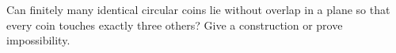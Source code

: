 Can finitely many identical circular coins lie without overlap in a plane so that every coin touches exactly three others? Give a construction or prove impossibility.
